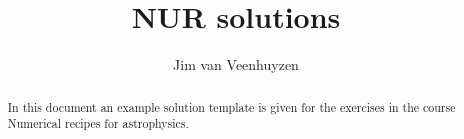 \documentclass[a4paper,10pt]{article}
\title{NUR solutions}
\author{Jim van Veenhuyzen}
\begin{document}
\maketitle

\begin{abstract}
 In this document an example solution template is given for the exercises in the 
 course Numerical recipes for astrophysics.
\end{abstract}


\end{document}
